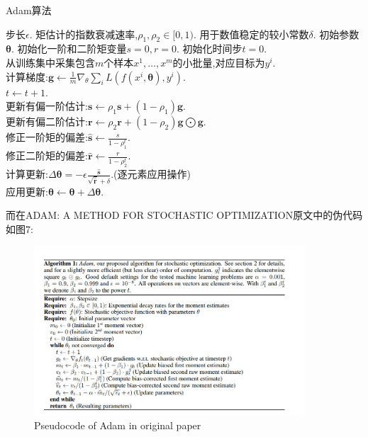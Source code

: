 \documentclass[UTF8,a4paper,11pt]{ctexart}
\begin{document}
\begin{algorithm}[H]
	\caption{Adam算法}  
	\begin{algorithmic} %
		\Require 步长$\epsilon$.
		\Require 矩估计的指数衰减速率,$\rho_{1},\rho_{2}\in[0,1)$.
		\Require 用于数值稳定的较小常数$\delta$.
		\Require 初始参数$\mathbf{\theta}$.
		\Require 初始化一阶和二阶矩变量$s=0,r=0$.
		\Require 初始化时间步$t=0$. 
		\\
		\qquad 从训练集中采集包含$m$个样本${x^{1},\dots,x^{m}}$的小批量,对应目标为$y^{i}$.\\
		\qquad 计算梯度:$\mathbf{g} \gets \frac{1}{m}\nabla_{\theta}\sum_{i}L(f(x^{i},\mathbf{\theta}),y^{i})$.\\
		\qquad $t\gets t+1$.\\
		\qquad 更新有偏一阶估计:$\mathbf{s}\gets \rho_{1}\mathbf{s}+(1-\rho_{1})\mathbf{g}$.\\
		\qquad 更新有偏二阶估计:$\mathbf{r}\gets \rho_{2}\mathbf{r}+(1-\rho_{2})\mathbf{g}\bigodot\mathbf{g}$.\\
		\qquad 修正一阶矩的偏差:$\hat{\mathbf{s}}\gets \frac{s}{1-\rho_{1}^{t}}$.\\
		\qquad 修正二阶矩的偏差:$\hat{\mathbf{r}}\gets \frac{r}{1-\rho_{2}^{t}}$.\\
		\qquad 计算更新:$\Delta \mathbf{\theta}=-\epsilon\frac{\hat{\mathbf{s}}}{\sqrt{\hat{\mathbf{r}}}+\delta}$.(逐元素应用操作)\\
		\qquad 应用更新:$\mathbf{\theta}\gets\mathbf{\theta}+\Delta\mathbf{\theta}$.
		\EndWhile  
		
	
	\end{algorithmic}  
\end{algorithm}  
\par 而在ADAM: A METHOD FOR STOCHASTIC OPTIMIZATION原文中的伪代码如图7:
\begin{figure}[htbp]
	\centering
	\includegraphics[width=0.9\textwidth,height=0.7\textwidth]{adam0.png}
	\caption{Pseudocode of Adam in original paper}
\end{figure}
\end{document}
